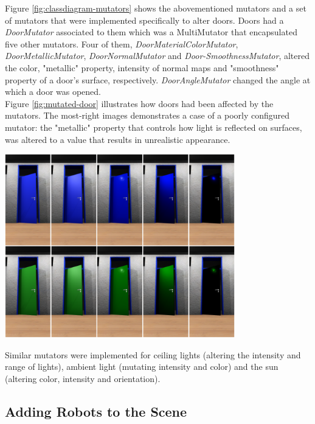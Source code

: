 Figure \ref{fig:classdiagram-mutators} shows the abovementioned mutators and a set of mutators that were implemented specifically to alter doors. Doors had a \textit{DoorMutator} associated to them which was a MultiMutator that encapsulated five other mutators. Four of them, \textit{DoorMaterialColorMutator}, \textit{DoorMetallicMutator}, \textit{DoorNormalMutator} and \textit{Door-SmoothnessMutator}, altered the color, "metallic" property, intensity of normal maps and "smoothness" property of a door's surface, respectively. \textit{DoorAngleMutator} changed the angle at which a door was opened.\\
Figure \ref{fig:mutated-door} illustrates how doors had been affected by the mutators. The most-right images demonstrates a case of a poorly configured mutator: the "metallic" property that controls how light is reflected on surfaces, was altered to a value that results in unrealistic appearance.
\begin{center}
\noindent\includegraphics[width=10cm]{tex/img/ch05/Results_Door.png}
\label{fig:mutated-door}
\end{center}
Similar mutators were implemented for ceiling lights (altering the intensity and range of lights), ambient light (mutating intensity and color) and the sun (altering color, intensity and orientation).

\subsection{Adding Robots to the Scene}
